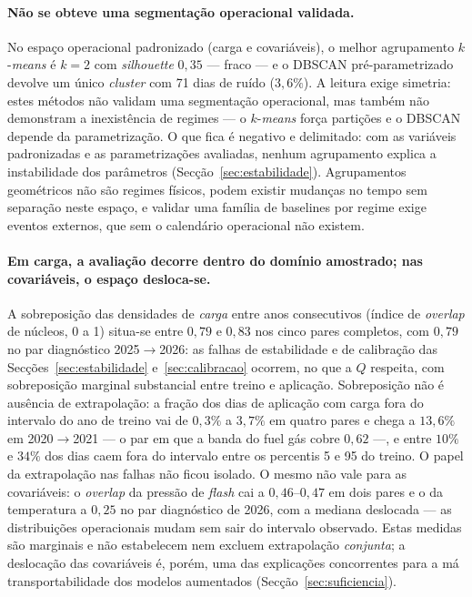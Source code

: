 \paragraph{Não se obteve uma segmentação operacional validada.} No espaço operacional padronizado (carga e covariáveis), o melhor
agrupamento $k$-\emph{means} é $k{=}2$ com \emph{silhouette} $0{,}35$ ---
fraco --- e o DBSCAN pré-parametrizado devolve um único \emph{cluster} com 71
dias de ruído ($3{,}6\%$). A leitura exige simetria: estes métodos não
validam uma segmentação operacional, mas também não demonstram a inexistência
de regimes --- o $k$-\emph{means} força partições e o DBSCAN depende da
parametrização. O que fica é negativo e delimitado: com as variáveis
padronizadas e as parametrizações avaliadas, nenhum agrupamento explica a
instabilidade dos parâmetros (Secção~\ref{sec:estabilidade}). Agrupamentos
geométricos não são regimes físicos, podem existir mudanças no tempo sem
separação neste espaço, e validar uma família de baselines por regime exige
eventos externos, que sem o calendário operacional não existem.


\paragraph{Em carga, a avaliação decorre dentro do domínio amostrado; nas
covariáveis, o espaço desloca-se.} A sobreposição das densidades de
\emph{carga} entre anos consecutivos (índice de \emph{overlap} de núcleos, 0
a 1) situa-se entre $0{,}79$ e $0{,}83$ nos cinco pares completos, com
$0{,}79$ no par diagnóstico 2025${\to}$2026: as falhas de estabilidade e de
calibração das Secções~\ref{sec:estabilidade} e~\ref{sec:calibracao}
ocorrem, no que a $Q$ respeita, com sobreposição marginal substancial entre
treino e aplicação. Sobreposição não é ausência de extrapolação: a fração
dos dias de aplicação com carga fora do intervalo do ano de treino vai de
$0{,}3\%$ a $3{,}7\%$ em quatro pares e chega a $13{,}6\%$ em
2020${\to}$2021 --- o par em que a banda do fuel gás cobre $0{,}62$ ---, e
entre $10\%$ e $34\%$ dos dias caem fora do intervalo entre os percentis 5 e
95 do treino. O papel da extrapolação nas falhas não ficou isolado. O mesmo não vale
para as covariáveis: o \emph{overlap} da pressão de \emph{flash} cai a
$0{,}46$--$0{,}47$ em dois pares e o da temperatura a $0{,}25$ no par
diagnóstico de 2026, com a mediana deslocada --- as distribuições
operacionais mudam sem sair do intervalo observado. Estas medidas são
marginais e não estabelecem nem excluem extrapolação \emph{conjunta}; a
deslocação das covariáveis é, porém, uma das explicações concorrentes para a
má transportabilidade dos modelos aumentados
(Secção~\ref{sec:suficiencia}).

